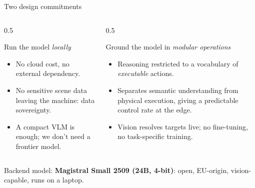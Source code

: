 \documentclass[aspectratio=169,11pt]{beamer}
\begin{document}
\begin{frame}{Two design commitments}
	\begin{columns}[t]
		\begin{column}{0.5\textwidth}
			\begin{block}{Run the model \emph{locally}}
				\begin{itemize}\small
					\item No cloud cost, no external dependency.
					\item No sensitive scene data leaving the machine: data sovereignty.
					\item A compact VLM is enough; we don't need a frontier model.
				\end{itemize}
			\end{block}
		\end{column}
		\begin{column}{0.5\textwidth}
			\begin{block}{Ground the model in \emph{modular operations}}
				\begin{itemize}\small
					\item Reasoning restricted to a vocabulary of \emph{executable} actions.
					\item Separates semantic understanding from physical execution,
					      giving a predictable control rate at the edge.
					\item Vision resolves targets live; no fine-tuning, no task-specific training.
				\end{itemize}
			\end{block}
		\end{column}
	\end{columns}
	\vfill
	\centering\small Backend model: \textbf{Magistral Small 2509 (24B, 4-bit)}: open, EU-origin, vision-capable, runs on a laptop.
\end{frame}
\end{document}
